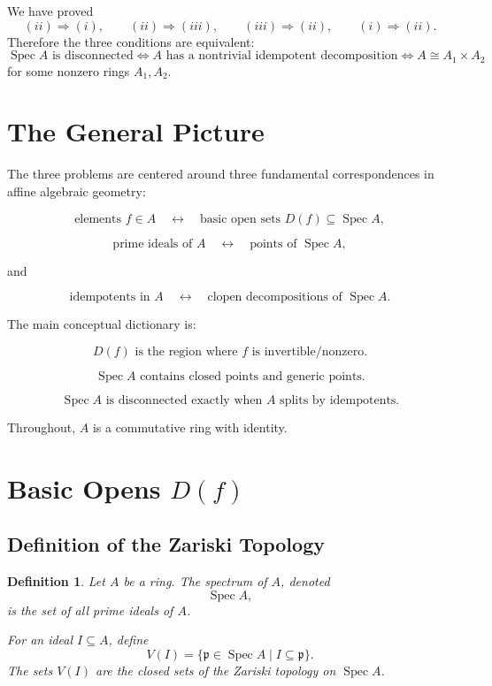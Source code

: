 \documentclass[12pt,a4paper]{article}
\newtheorem{definition}{Definition}[section]
\newcommand{\Spec}{\operatorname{Spec}}
\newcommand{\mfp}{\mathfrak p}
\begin{document}
	We have proved
	\[
	(ii)\Rightarrow(i),
	\qquad
	(ii)\Rightarrow(iii),
	\qquad
	(iii)\Rightarrow(ii),
	\qquad
	(i)\Rightarrow(ii).
	\]
	Therefore the three conditions are equivalent:
	\[
	\boxed{
		\Spec A \text{ is disconnected}
		\iff
		A \text{ has a nontrivial idempotent decomposition}
		\iff
		A\cong A_1\times A_2
	}
	\]
	for some nonzero rings \(A_1,A_2\).

\section{The General Picture}

The three problems are centered around three fundamental correspondences in
affine algebraic geometry:

\[
\text{elements } f\in A
\quad\longleftrightarrow\quad
\text{basic open sets }D(f)\subseteq \Spec A,
\]

\[
\text{prime ideals of }A
\quad\longleftrightarrow\quad
\text{points of }\Spec A,
\]

and

\[
\text{idempotents in }A
\quad\longleftrightarrow\quad
\text{clopen decompositions of }\Spec A.
\]

The main conceptual dictionary is:

\[
\boxed{
	D(f)\text{ is the region where }f\text{ is invertible/nonzero.}
}
\]

\[
\boxed{
	\Spec A\text{ contains closed points and generic points.}
}
\]

\[
\boxed{
	\Spec A\text{ is disconnected exactly when }A\text{ splits by idempotents.}
}
\]

Throughout, \(A\) is a commutative ring with identity.

\section{Basic Opens \(D(f)\)}

\subsection{Definition of the Zariski Topology}

\begin{definition}
	Let \(A\) be a ring. The spectrum of \(A\), denoted
	\[
	\Spec A,
	\]
	is the set of all prime ideals of \(A\).
	
	For an ideal \(I\subseteq A\), define
	\[
	V(I)=\{\mfp\in \Spec A\mid I\subseteq \mfp\}.
	\]
	The sets \(V(I)\) are the closed sets of the Zariski topology on \(\Spec A\).
\end{definition}
\end{document}
